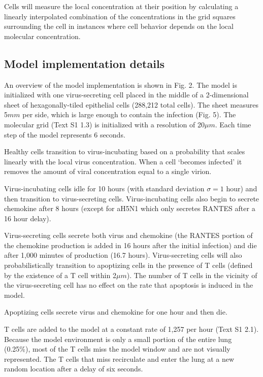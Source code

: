 \documentclass[10pt]{article}
\begin{document}
Cells will measure the local concentration at their position by calculating a linearly interpolated combination of the concentrations in the grid squares surrounding the cell in instances where cell behavior depends on the local molecular concentration.


\subsection{Model implementation details}

An overview of the model implementation is shown in Fig. 2.  The model is initialized with one virus-secreting cell placed in the middle of a 2-dimensional sheet of hexagonally-tiled epithelial cells (288,212 total cells).  The sheet measures 5$mm$ per side, which is large enough to contain the infection (Fig. 5).  The molecular grid (Text S1 1.3) is initialized with a resolution of 20$\mu m$.  Each time step of the model represents 6 seconds.

Healthy cells transition to virus-incubating based on a probability that scales linearly with the local virus concentration.   When a cell `becomes infected' it removes the amount of viral concentration equal to a single virion. 

Virus-incubating cells idle for 10 hours (with standard deviation $\sigma=1$ hour) and then transition to virus-secreting cells.  Virus-incubating cells also begin to secrete chemokine after 8 hours (except for aH5N1 which only secretes RANTES after a 16 hour delay).  

Virus-secreting cells secrete both virus and chemokine (the RANTES portion of the chemokine production is added in 16 hours after the initial infection) and die after 1,000 minutes of production (16.7 hours).  Virus-secreting cells will also probabilistically transition to apoptizing cells in the presence of T cells (defined by the existence of a T cell within 2$\mu m$).  The number of T cells in the vicinity of the virus-secreting cell has no effect on the rate that apoptosis is induced in the model.

Apoptizing cells secrete virus and chemokine for one hour and then die.

T cells are added to the model at a constant rate of 1,257 per hour (Text S1 2.1).  Because the model environment is only a small portion of the entire lung (0.25\%), most of the T cells miss the model window and are not visually represented.  The T cells that miss recirculate and enter the lung at a new random location after a delay of six seconds.
\end{document}
